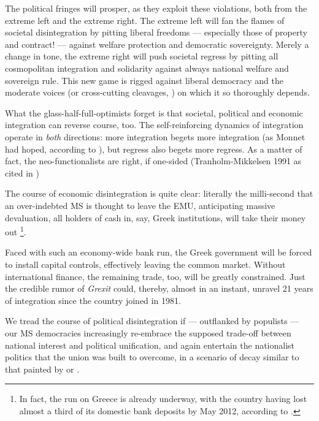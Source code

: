 \documentclass[11pt,a4paper,oneside,openright]{article}
\begin{document}
The political fringes will prosper, as they exploit these violations, both from the extreme left and the extreme right. 
The extreme left will fan the flames of societal disintegration by pitting liberal freedoms --- especially those of property and contract! --- against welfare protection and democratic sovereignty. 
Merely a change in tone, the extreme right will push societal regress by pitting all cosmopolitan integration and solidarity against always national welfare and sovereign rule. 
This new game is rigged against liberal democracy and the moderate voices (or cross-cutting cleavages, \citealt{LipsetRokkan-1967-aa}) on which it so thoroughly depends. 

What the glass-half-full-optimists forget is that societal, political and economic integration can reverse course, too. 
The self-reinforcing dynamics of integration operate in \emph{both} directions: 
more integration begets more integration (as Monnet had hoped, according to \citealt[948]{Schmitter1999}), but regress also begets more regress. 
As a matter of fact, the neo-functionalists are right, if one-sided (Tranholm-Mikkelsen 1991 as cited in \citealt[1]{Bieler2003})

The course of economic disintegration is quite clear: 
literally the milli-second that an over-indebted \gls{MS} is thought to leave the \gls{EMU}, anticipating massive devaluation, all holders of cash in, say, Greek institutions, will take their money out
\footnote{
	In fact, the run on Greece is already underway, with the country having lost almost a third of its domestic bank deposits by May 2012, according to \cite{TheEconomist2012}.
}. 
	
Faced with such an economy-wide bank run, the Greek government will be forced to install capital controls, effectively leaving the common market. 
Without international finance, the remaining trade, too, will be greatly constrained. 
Just the credible rumor of \emph{Grexit} could, thereby, almost in an instant, unravel 21 years of integration since the country joined in 1981.

We tread the course of political disintegration if --- outflanked by populists --- our \gls{MS} democracies increasingly re-embrace the supposed trade-off between national interest and political unification, and again entertain the nationalist politics that the union was built to overcome, in a scenario of decay similar to that painted by \cite[339ff]{BeckGrande-2007-aa} or \cite[947]{Schmitter1999}.
\end{document}
